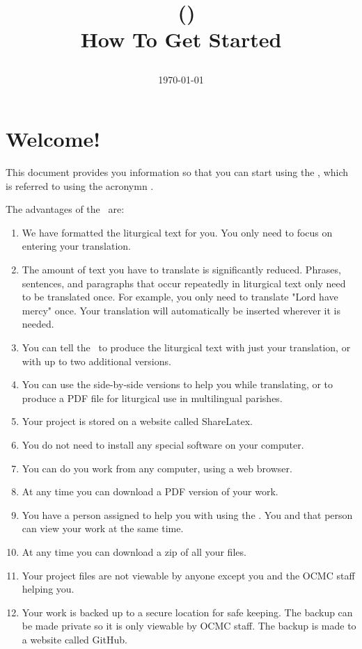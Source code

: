 \documentclass[]{memoir}
\title{

\ltOcmcSystem\  (\ltOcmcSystemAcronymn)\\

\bigskip\vskip 0.2in
\HUGE How To Get Started\\
\bigskip\vskip 0.2in
\normalsize
}
\author{%
\ltDocPreparedForBy{\ltDocLanguage}{\ltDocPreparedFor}{\ltDocPreparedBy}
}
\date{\today}
\begin{document}
\setcounter{secnumdepth}{1}

\maketitle

\vfill

\pagebreak
\mainmatter
\chapter{Welcome!}
This document provides you information so that you can start using the \ltOcmcSystem, which is referred to using the acronymn \ltOcmcSystemAcronymn.

The advantages of the \ltOcmcSystemAcronymn\ are:
\begin{enumerate}
\item We have formatted the liturgical text for you.  You only need to focus on entering your translation.
\item The amount of text you have to translate is significantly reduced.  Phrases, sentences, and paragraphs that occur repeatedly in liturgical text only need to be translated once.  For example, you only need to translate "Lord have mercy" once.  Your translation will automatically be inserted wherever it is needed.
\item You can tell the \ltOcmcSystemAcronymn\ to produce the liturgical text with just your translation, or with up to two additional versions.
\item You can use the side-by-side versions to help you while translating, or to produce a PDF file for liturgical use in multilingual parishes.
\item Your project is stored on a website called ShareLatex.
\item You do not need to install any special software on your computer.
\item You can do you work from any computer, using a web browser.
\item At any time you can download a PDF version of your work.
\item You have a person assigned to help you with using the \ltOcmcSystemAcronymn.  You and that person can view your work at the same time.
\item At any time you can download a zip of all your files.
\item Your project files are not viewable by anyone except you and the OCMC staff helping you.
\item Your work is backed up to a secure location for safe keeping.  The backup can be made private so it is only viewable by OCMC staff.  The backup is made to a website called GitHub.
\end{enumerate}
\end{document}
